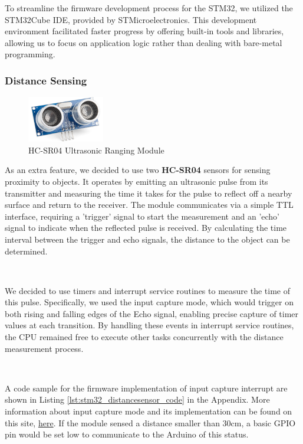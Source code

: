 \documentclass{article}
\begin{document}
To streamline the firmware development process for the STM32, we utilized the STM32Cube IDE, provided by STMicroelectronics. This development environment facilitated faster progress by offering built-in tools and libraries, allowing us to focus on application logic rather than dealing with bare-metal programming.



\subsubsection{Distance Sensing}
\label{sec:distancesensor}

\begin{figure}[H]
    \centering
    \includegraphics[width=0.3\textwidth]{Figures/distancesensor.png} %
    \caption{HC-SR04 Ultrasonic Ranging Module}
    \label{fig:distancesensor}
\end{figure}

As an extra feature, we decided to use two \textbf{HC-SR04} sensors for sensing proximity to objects. It operates by emitting an ultrasonic pulse from its transmitter and measuring the time it takes for the pulse to reflect off a nearby surface and return to the receiver. The module communicates via a simple TTL interface, requiring a 'trigger' signal to start the measurement and an 'echo' signal to indicate when the reflected pulse is received. By calculating the time interval between the trigger and echo signals, the distance to the object can be determined.

\

We decided to use timers and interrupt service routines to measure the time of this pulse. Specifically, we used the input capture mode, which would trigger on both rising and falling edges of the Echo signal, enabling precise capture of timer values at each transition. By handling these events in interrupt service routines, the CPU remained free to execute other tasks concurrently with the distance measurement process.

\

A code sample for the firmware implementation of input capture interrupt are shown in Listing \ref{lst:stm32_distancesensor_code} in the Appendix. More information about input capture mode and its implementation can be found on this site, \href{https://community.st.com/t5/stm32-mcus/how-to-use-the-input-capture-feature/ta-p/704161}{here}. If the module sensed a distance smaller than 30cm, a basic GPIO pin would be set low to communicate to the Arduino of this status.
\end{document}
